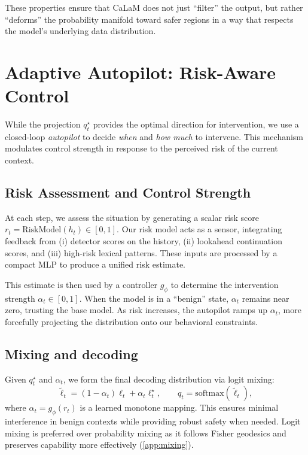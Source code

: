 \documentclass{article}
\theoremstyle{plain}
\theoremstyle{definition}
\theoremstyle{remark}
\begin{document}
These properties ensure that CaLaM does not just ``filter'' the output, but rather ``deforms'' the probability manifold toward safer regions in a way that respects the model's underlying data distribution.

\section{Adaptive Autopilot: Risk-Aware Control}
\label{sec:controller}

While the projection $q_t^\star$ provides the optimal direction for intervention, we use a closed-loop \emph{autopilot} to decide \emph{when} and \emph{how much} to intervene. This mechanism modulates control strength in response to the perceived risk of the current context.

\subsection{Risk Assessment and Control Strength}
At each step, we assess the situation by generating a scalar risk score $r_t = \mathrm{RiskModel}(h_t) \in [0,1]$. Our risk model acts as a sensor, integrating feedback from (i) detector scores on the history, (ii) lookahead continuation scores, and (iii) high-risk lexical patterns. These inputs are processed by a compact MLP to produce a unified risk estimate.

This estimate is then used by a controller $g_\phi$ to determine the intervention strength $\alpha_t \in [0,1]$. When the model is in a ``benign'' state, $\alpha_t$ remains near zero, trusting the base model. As risk increases, the autopilot ramps up $\alpha_t$, more forcefully projecting the distribution onto our behavioral constraints.

\subsection{Mixing and decoding}
Given $q_t^\star$ and $\alpha_t$, we form the final decoding distribution via logit mixing:
\begin{equation}
  \tilde{\ell}_t = (1-\alpha_t)\ell_t + \alpha_t \ell_t^\star,
  \qquad
  q_t = \mathrm{softmax}(\tilde{\ell}_t),
  \label{eq:logit-mix}
\end{equation}
where $\alpha_t = g_\phi(r_t)$ is a learned monotone mapping. This ensures minimal interference in benign contexts while providing robust safety when needed. Logit mixing is preferred over probability mixing as it follows Fisher geodesics and preserves capability more effectively (\cref{app:mixing}).
\end{document}
